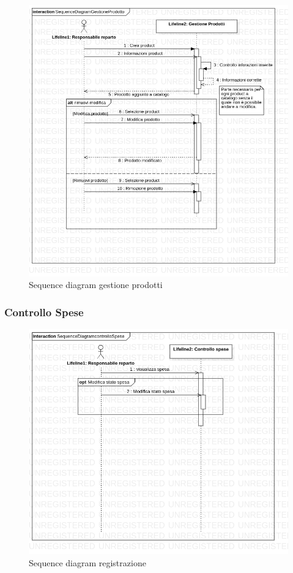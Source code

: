 \documentclass[12pt, a4paper]{article}
\numberwithin{equation}{section} %
\begin{document}
\begin{figure}[h]
\centering
\includegraphics[width=\textwidth]{Use Case Model!Gestione prodotti!InteractionGestioneProdotti!SequenceDiagramGestioneProdotto_9.png}
\caption{Sequence diagram gestione prodotti}
\end{figure}

\subsubsection{Controllo Spese}

\begin{figure}[h]
\centering
\includegraphics[width=\textwidth]{Use Case Model!Controllo spese!InteractionConstrolloSpese!SequenceDiagramcontrolloSpese_11.png}
\caption{Sequence diagram registrazione}
\end{figure}
\end{document}
